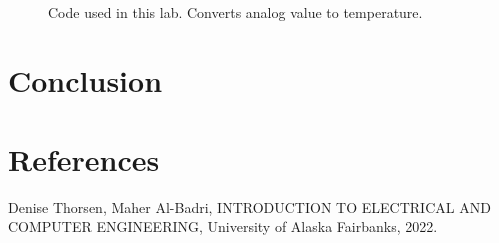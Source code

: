 \documentclass{article}
\begin{document}
\paragraph{}

\paragraph{}

\begin{figure}[H]
	\caption{Code used in this lab. Converts analog value to temperature.}
\end{figure}




\newpage
\section{Conclusion}

\newpage
\section{References}
\noindent
[1] Denise Thorsen, Maher Al-Badri, INTRODUCTION TO ELECTRICAL AND COMPUTER ENGINEERING, University of Alaska Fairbanks, 2022.
\newline
\newline
\noindent
\end{document}
